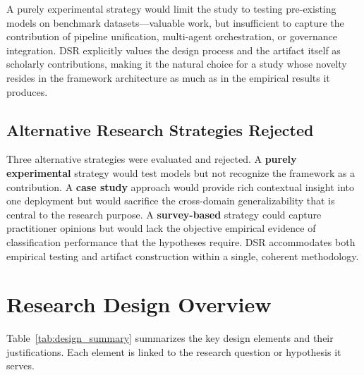 A purely experimental strategy would limit the study to testing pre-existing models on benchmark datasets---valuable work, but insufficient to capture the contribution of pipeline unification, multi-agent orchestration, or governance integration. DSR explicitly values the design process and the artifact itself as scholarly contributions, making it the natural choice for a study whose novelty resides in the framework architecture as much as in the empirical results it produces.

\subsection{Alternative Research Strategies Rejected}

Three alternative strategies were evaluated and rejected. A \textbf{purely experimental} strategy would test models but not recognize the framework as a contribution. A \textbf{case study} approach would provide rich contextual insight into one deployment but would sacrifice the cross-domain generalizability that is central to the research purpose. A \textbf{survey-based} strategy could capture practitioner opinions but would lack the objective empirical evidence of classification performance that the hypotheses require. DSR accommodates both empirical testing and artifact construction within a single, coherent methodology.

\section{Research Design Overview}
\label{sec:design_overview}

Table~\ref{tab:design_summary} summarizes the key design elements and their justifications. Each element is linked to the research question or hypothesis it serves.

